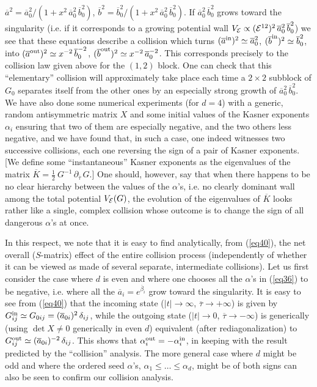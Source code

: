 \documentclass[a4paper,12pt]{article}
\begin{document}
$\overline a^2 = \overline a_0^2/(1 + x^2 \, \overline a_0^2 \, 
\overline b_0^2)$,
$\overline b^2 = \overline b_0^2 /(1 + x^2 \, 
\overline a_0^2 \, \overline b_0^2)$.
If $\overline a_0^2 \, \overline b_0^2$ grows toward the singularity 
(i.e. if it corresponds to a growing potential wall $V_{\cal E} \propto 
({\cal E}^{12})^2 \, \overline a_0^2 \, \overline b_0^2$) we see that 
these equations describe a collision which turns $(\overline a^{\rm 
in})^2 \simeq \overline a_0^2$, $(\overline b^{\rm in})^2 \simeq 
\overline b_0^2$, into $(\overline a^{\rm out})^2 \simeq x^{-2} \,  
\overline b_0^{-2}$, $(\overline b^{\rm out})^2 \simeq x^{-2} \,  
\overline a_0^{-2}$. This corresponds precisely to the collision
law given above for the 
$(1,2)$ block. One can check that this ``elementary'' collision will 
approximately take place each time a $2 \times 2$ subblock of $G_0$ 
separates itself from the other ones by an especially strong growth of 
$\overline a_0^2 \, \overline b_0^2$. We have also done some numerical 
experiments (for $d=4$) with a generic, random antisymmetric matrix $X$ 
and some initial values of the Kasner exponents $\alpha_i$ ensuring that 
two of them are especially negative, and the two others less negative, 
and we have found that, in such a case, one indeed witnesses two 
successive collisions, each one reversing the sign of a pair of Kasner 
exponents. [We define some ``instantaneous'' Kasner exponents as the
eigenvalues of the matrix  $\overline K = \frac{1}{2} \ G^{-1} \, 
\partial_{\overline \tau} \, G$.]  One
should, however, say that when there happens to be no clear hierarchy 
between the values of the $\alpha$'s, i.e. no clearly dominant wall 
among the total potential $V_{\cal E} (G)$, the evolution of the 
eigenvalues of $\overline K$ looks rather like a single, complex 
collision whose outcome is to change the sign of all dangerous 
$\alpha$'s at once. 

In this respect, we note that it is easy to find 
analytically, from (\ref{eq40}), the net overall ($S$-matrix) effect of 
the entire collision process (independently of whether it can be viewed 
as made of several separate, intermediate collisions). Let us first 
consider the case where $d$ is even and where one chooses all the 
$\alpha$'s in (\ref{eq36}) to be negative, i.e. where all the $\overline 
a_i = e^{\overline \beta_i}$ grow toward the singularity. It is easy to 
see from (\ref{eq40}) that the incoming state ($\vert t \vert 
\rightarrow \infty$, $\overline \tau \rightarrow + \infty$) is given by 
$G_{ij}^{\rm in} \simeq G_{0ij} = (\overline a_{0i})^2 \, \delta_{ij}$, 
while the outgoing state ($\vert t \vert \rightarrow 0$, $\overline \tau 
\rightarrow - \infty$) is generically (using $\det X \ne 0$ generically 
in even $d$) equivalent (after rediagonalization) to $G_{ij}^{\rm out} 
\simeq (\overline a_{0i})^{-2} \, \delta_{ij}$. This shows that 
$\alpha_i^{\rm out} = -\alpha_i^{\rm in}$, in keeping with the result 
predicted by the ``collision'' analysis. The more general case where $d$ 
might be odd and where the ordered seed $\alpha$'s, $\alpha_1 \leq 
\ldots \leq \alpha_d$, might be of both signs can also be seen to 
confirm our collision analysis. 
\end{document}

